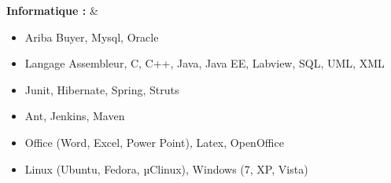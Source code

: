 \textbf{Informatique :}
& \begin{itemize}
    \item Ariba Buyer, Mysql, Oracle
	\item Langage Assembleur, C, C++, Java, Java EE, Labview, SQL, UML, XML
    \item Junit, Hibernate, Spring, Struts
    \item Ant, Jenkins, Maven
    \item Office (Word, Excel, Power Point), Latex, OpenOffice
    \item Linux (Ubuntu, Fedora, µClinux), Windows (7, XP, Vista)
\end{itemize} \\
